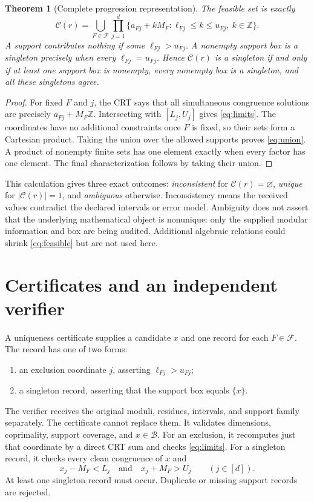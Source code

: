\documentclass[11pt]{article}
\newtheorem{theorem}{Theorem}
\theoremstyle{definition}\newtheorem{definition}[theorem]{Definition}
\newcommand{\Z}{\mathbb Z}
\newcommand{\F}{\mathcal F}
\newcommand{\B}{\mathcal B}
\newcommand{\C}{\mathcal C}
\begin{document}
\begin{theorem}[Complete progression representation]\label{thm:boxes}
The feasible set is exactly
\begin{equation}\label{eq:union}
 \C(r)=\bigcup_{F\in\F}\prod_{j=1}^d
 \{a_{Fj}+kM_F:\ell_{Fj}\le k\le u_{Fj},\ k\in\Z\}.
\end{equation}
A support contributes nothing if some $\ell_{Fj}>u_{Fj}$. A nonempty support box is a singleton precisely when every $\ell_{Fj}=u_{Fj}$. Hence $\C(r)$ is a singleton if and only if at least one support box is nonempty, every nonempty box is a singleton, and all these singletons agree.
\end{theorem}
\begin{proof}
For fixed $F$ and $j$, the CRT says that all simultaneous congruence solutions are precisely $a_{Fj}+M_F\Z$. Intersecting with $[L_j,U_j]$ gives \eqref{eq:limits}. The coordinates have no additional constraints once $F$ is fixed, so their sets form a Cartesian product. Taking the union over the allowed supports proves \eqref{eq:union}. A product of nonempty finite sets has one element exactly when every factor has one element. The final characterization follows by taking their union.
\end{proof}

This calculation gives three exact outcomes: \emph{inconsistent} for $\C(r)=\varnothing$, \emph{unique} for $|\C(r)|=1$, and \emph{ambiguous} otherwise. Inconsistency means the received values contradict the declared intervals or error model. Ambiguity does not assert that the underlying mathematical object is nonunique: only the supplied modular information and box are being audited. Additional algebraic relations could shrink \eqref{eq:feasible} but are not used here.

\section{Certificates and an independent verifier}
A uniqueness certificate supplies a candidate $x$ and one record for each $F\in\F$. The record has one of two forms:
\begin{enumerate}
\item an exclusion coordinate $j$, asserting $\ell_{Fj}>u_{Fj}$;
\item a singleton record, asserting that the support box equals $\{x\}$.
\end{enumerate}
The verifier receives the original moduli, residues, intervals, and support family separately. The certificate cannot replace them. It validates dimensions, coprimality, support coverage, and $x\in\B$. For an exclusion, it recomputes just that coordinate by a direct CRT sum and checks \eqref{eq:limits}. For a singleton record, it checks every clean congruence of $x$ and
\begin{equation}\label{eq:adjacent}
 x_j-M_F<L_j\quad\text{and}\quad x_j+M_F>U_j\qquad (j\in[d]).
\end{equation}
At least one singleton record must occur. Duplicate or missing support records are rejected.
\end{document}
